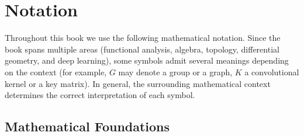 \chapter*{Notation}

Throughout this book we use the following mathematical notation.
Since the book spans multiple areas (functional analysis, algebra,
topology, differential geometry, and deep learning), some symbols
admit several meanings depending on the context (for example, $G$ may denote
a group or a graph, $K$ a convolutional kernel or a key matrix).
In general, the surrounding mathematical context determines the
correct interpretation of each symbol.

\section*{Mathematical Foundations}


